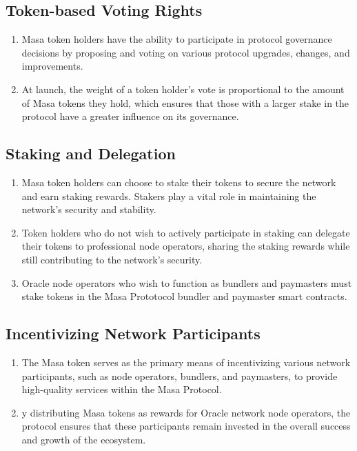 \documentclass{article}
\begin{document}
\subsection{Token-based Voting Rights}
\begin{enumerate}
\item Masa token holders have the ability to participate in protocol governance decisions by proposing and voting on various protocol upgrades, changes, and improvements. 
\item At launch, the weight of a token holder's vote is proportional to the amount of Masa tokens they hold, which ensures that those with a larger stake in the protocol have a greater influence on its governance. 
\end{enumerate}
\subsection{Staking and Delegation}
\begin{enumerate}
\item Masa token holders can choose to stake their tokens to secure the network and earn staking rewards. Stakers play a vital role in maintaining the network's security and stability.
\item Token holders who do not wish to actively participate in staking can delegate their tokens to professional node operators, sharing the staking rewards while still contributing to the network's security.
\item Oracle node operators who wish to function as bundlers and paymasters must stake tokens in the Masa Prototocol bundler and paymaster smart contracts.
\end{enumerate}
\subsection{Incentivizing Network Participants}
\begin{enumerate}
\item The Masa token serves as the primary means of incentivizing various network participants, such as node operators, bundlers, and paymasters, to provide high-quality services within the Masa Protocol.
\item y distributing Masa tokens as rewards for Oracle network node operators, the protocol ensures that these participants remain invested in the overall success and growth of the ecosystem.
\end{enumerate}
\end{document}
